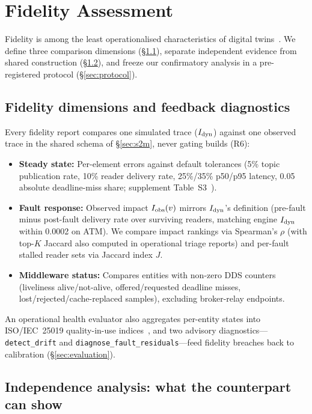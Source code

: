 \section{Fidelity Assessment}
\label{sec:fidelity}

Fidelity is among the least operationalised characteristics of digital twins~\citep{jones2020characterising}. We define three comparison dimensions (\S\ref{sec:dimensions}), separate independent evidence from shared construction (\S\ref{sec:independence}), and freeze our confirmatory analysis in a pre-registered protocol (\S\ref{sec:protocol}).

\subsection{Fidelity dimensions and feedback diagnostics}
\label{sec:dimensions}

Every fidelity report compares one simulated trace ($I_{\mathrm{dyn}}$) against one observed trace in the shared schema of \S\ref{sec:s2m}, never gating builds (R6):
\begin{itemize}[leftmargin=*,nosep]
  \item \textbf{Steady state:} Per-element errors against default tolerances (5\% topic publication rate, 10\% reader delivery rate, 25\%/35\% p50/p95 latency, 0.05 absolute deadline-miss share; supplement Table~S3~\citealp{sag-software}).
  \item \textbf{Fault response:} Observed impact $I_{\mathrm{obs}}(v)$ mirrors $I_{\mathrm{dyn}}$'s definition (pre-fault minus post-fault delivery rate over surviving readers, matching engine $I_{\mathrm{dyn}}$ within 0.0002 on ATM). We compare impact rankings via Spearman's $\rho$ (with top-$K$ Jaccard also computed in operational triage reports) and per-fault stalled reader sets via Jaccard index $J$.
  \item \textbf{Middleware status:} Compares entities with non-zero DDS counters (liveliness alive/not-alive, offered/requested deadline misses, lost/rejected/cache-replaced samples), excluding broker-relay endpoints.
\end{itemize}
An operational health evaluator also aggregates per-entity states into ISO/IEC~25019 quality-in-use indices~\citep{iso25019}, and two advisory diagnostics---\texttt{detect\_drift} and \texttt{diagnose\_\allowbreak fault\_\allowbreak residuals}---feed fidelity breaches back to calibration (\S\ref{sec:evaluation}).

\subsection{Independence analysis: what the counterpart can show}
\label{sec:independence}

